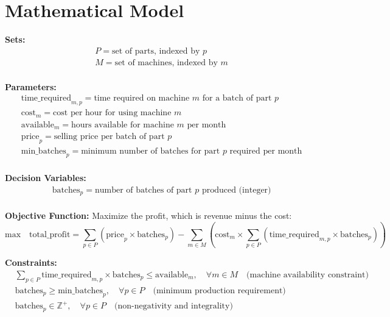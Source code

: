 \documentclass{article}
\begin{document}
\section*{Mathematical Model}

\textbf{Sets:}
\begin{align*}
  & P = \text{set of parts, indexed by } p \\
  & M = \text{set of machines, indexed by } m \\
\end{align*}

\textbf{Parameters:}
\begin{align*}
  & \text{time\_required}_{m,p} = \text{time required on machine } m \text{ for a batch of part } p \\
  & \text{cost}_{m} = \text{cost per hour for using machine } m \\
  & \text{available}_{m} = \text{hours available for machine } m \text{ per month} \\
  & \text{price}_{p} = \text{selling price per batch of part } p \\
  & \text{min\_batches}_{p} = \text{minimum number of batches for part } p \text{ required per month} \\
\end{align*}

\textbf{Decision Variables:}
\begin{align*}
  & \text{batches}_{p} = \text{number of batches of part } p \text{ produced (integer)} \\
\end{align*}

\textbf{Objective Function:}
Maximize the profit, which is revenue minus the cost:
\[
\text{max} \quad \text{total\_profit} = \sum_{p \in P} (\text{price}_{p} \times \text{batches}_{p}) - \sum_{m \in M} \left( \text{cost}_{m} \times \sum_{p \in P} (\text{time\_required}_{m,p} \times \text{batches}_{p}) \right)
\]

\textbf{Constraints:}
\begin{align*}
  & \sum_{p \in P} \text{time\_required}_{m,p} \times \text{batches}_{p} \leq \text{available}_{m}, \quad \forall m \in M \quad \text{(machine availability constraint)} \\
  & \text{batches}_{p} \geq \text{min\_batches}_{p}, \quad \forall p \in P \quad \text{(minimum production requirement)} \\
  & \text{batches}_{p} \in \mathbb{Z}^{+}, \quad \forall p \in P \quad \text{(non-negativity and integrality)}
\end{align*}
\end{document}
